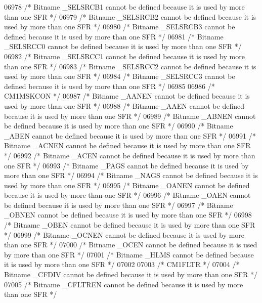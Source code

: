 \begin{DoxyCode}
06978 \textcolor{comment}{/* Bitname \_SELSRCB1 cannot be defined because it is used by more than one SFR */}
06979 \textcolor{comment}{/* Bitname \_SELSRCB2 cannot be defined because it is used by more than one SFR */}
06980 \textcolor{comment}{/* Bitname \_SELSRCB3 cannot be defined because it is used by more than one SFR */}
06981 \textcolor{comment}{/* Bitname \_SELSRCC0 cannot be defined because it is used by more than one SFR */}
06982 \textcolor{comment}{/* Bitname \_SELSRCC1 cannot be defined because it is used by more than one SFR */}
06983 \textcolor{comment}{/* Bitname \_SELSRCC2 cannot be defined because it is used by more than one SFR */}
06984 \textcolor{comment}{/* Bitname \_SELSRCC3 cannot be defined because it is used by more than one SFR */}
06985 
06986 \textcolor{comment}{/* CM1MSKCON */}
06987 \textcolor{comment}{/* Bitname \_AANEN cannot be defined because it is used by more than one SFR */}
06988 \textcolor{comment}{/* Bitname \_AAEN cannot be defined because it is used by more than one SFR */}
06989 \textcolor{comment}{/* Bitname \_ABNEN cannot be defined because it is used by more than one SFR */}
06990 \textcolor{comment}{/* Bitname \_ABEN cannot be defined because it is used by more than one SFR */}
06991 \textcolor{comment}{/* Bitname \_ACNEN cannot be defined because it is used by more than one SFR */}
06992 \textcolor{comment}{/* Bitname \_ACEN cannot be defined because it is used by more than one SFR */}
06993 \textcolor{comment}{/* Bitname \_PAGS cannot be defined because it is used by more than one SFR */}
06994 \textcolor{comment}{/* Bitname \_NAGS cannot be defined because it is used by more than one SFR */}
06995 \textcolor{comment}{/* Bitname \_OANEN cannot be defined because it is used by more than one SFR */}
06996 \textcolor{comment}{/* Bitname \_OAEN cannot be defined because it is used by more than one SFR */}
06997 \textcolor{comment}{/* Bitname \_OBNEN cannot be defined because it is used by more than one SFR */}
06998 \textcolor{comment}{/* Bitname \_OBEN cannot be defined because it is used by more than one SFR */}
06999 \textcolor{comment}{/* Bitname \_OCNEN cannot be defined because it is used by more than one SFR */}
07000 \textcolor{comment}{/* Bitname \_OCEN cannot be defined because it is used by more than one SFR */}
07001 \textcolor{comment}{/* Bitname \_HLMS cannot be defined because it is used by more than one SFR */}
07002 
07003 \textcolor{comment}{/* CM1FLTR */}
07004 \textcolor{comment}{/* Bitname \_CFDIV cannot be defined because it is used by more than one SFR */}
07005 \textcolor{comment}{/* Bitname \_CFLTREN cannot be defined because it is used by more than one SFR */}

\end{DoxyCode}
